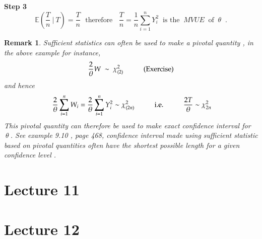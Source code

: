 \documentclass[14pt,twoside,a4paper,fleqn]{article}
\theoremstyle{plain}
\newtheorem*{remark*}{Remark}
\begin{document}
\tab\textbf{Step 3}
$$
	\mathbb{E}(\frac{T}{n}\ \big|\ T) = \frac{T}{n}\ \ \ \text{therefore} \ \ \ \ \frac{T}{n}=\frac{1}{n}\sum\limits_{i=1}^n Y_i^2\ \text{\ \ \ is the $\ MVUE\ $ of $\ \theta\ $ .}
$$
\begin{remark*}\emph{
Sufficient statistics can often be used to make a pivotal quantity , in the above example for instance,
$$
	\frac{2}{\theta} W\ \sim\ \chi^2_{(2)} \hspace*{1cm}\text{(Exercise)}
$$
and hence 
$$\ \frac{2}{\theta}\sum\limits_{i=1}^n W_i = \frac{2}{\theta}\sum\limits_{i=1}^n Y_i^2 \sim \chi^2_{(2n)}\tab\text{i.e.\tab} \frac{2T}{\theta}\sim\chi^2_{2n}$$
This pivotal quantity can therefore be used to make \emph{exact confidence interval} for $\ \theta\ $. See example 9.10 , page 468, confidence interval made using sufficient statistic based on pivotal quantities often have the shortest possible length for a given confidence level .
}\end{remark*}










































































\newpage
\section{Lecture 11}
\section{Lecture 12}
\end{document}
